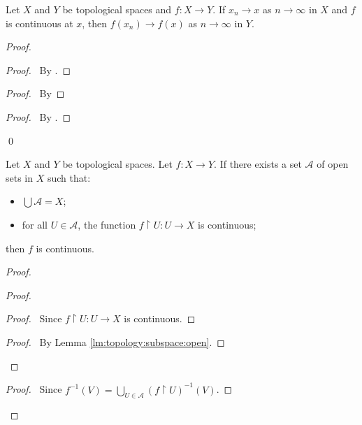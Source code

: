 \begin{thm}
  Let $X$ and $Y$ be topological spaces and $f : X \rightarrow Y$.
  If $x_n \rightarrow x$ as $n \rightarrow \infty$ in $X$ and $f$ is
  continuous
  at $x$, then $f(x_n)
  \rightarrow f(x)$ as $n \rightarrow \infty$ in $Y$.
\end{thm}

\begin{proof}
  \pf
  \begin{proof}
    \pf\ By .
  \end{proof}
  \begin{proof}
    \pf\ By 
  \end{proof}
  \begin{proof}
    \pf\ By .
  \end{proof}
  \qed
\end{proof}

\begin{thm}
  \label{thm:topology:continuous:local}
  Let $X$ and $Y$ be topological spaces.
  Let $f : X \rightarrow Y$. If there exists a set $\mathcal{A}$ of open
  sets in
  $X$ such that:
  \begin{itemize}
    \item $\bigcup \mathcal{A} = X$;
    \item for all $U \in \mathcal{A}$, the function $f \restriction U : U
    \rightarrow X$ is continuous;
  \end{itemize}
  then $f$ is continuous.
\end{thm}

\begin{proof}
  \pf
  \begin{proof}
    \begin{proof}
      \pf\ Since $f \restriction U : U \rightarrow X$ is continuous.
    \end{proof}
    \qedstep
    \begin{proof}
      \pf\ By Lemma \ref{lm:topology:subspace:open}.
    \end{proof}
  \end{proof}
  \qedstep
  \begin{proof}
    \pf\ Since $f^{-1}(V) = \bigcup_{U \in \mathcal{A}} (f \restriction
    U)^{-1}(V)$.
  \end{proof}
\end{proof}

